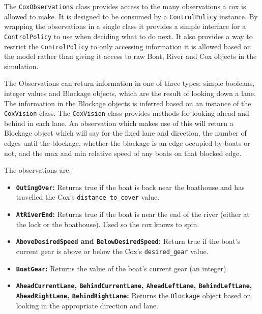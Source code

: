 The \texttt{CoxObservations} class provides access to the many observations a cox is allowed to make. It is designed to be consumed by a \texttt{ControlPolicy} instance. By wrapping the observations in a single class it provides a simple interface for a \texttt{ControlPolicy} to use when deciding what to do next. It also provides a way to restrict the \texttt{ControlPolicy} to only accessing information it is allowed based on the model rather than giving it access to raw Boat, River and Cox objects in the simulation.

The Observations can return information in one of three types: simple booleans, integer values and Blockage objects, which are the result of looking down a lane. The information in the Blockage objects is inferred based on an instance of the \texttt{CoxVision} class. The \texttt{CoxVision} class provides methods for looking ahead and behind in each lane. An observation which makes use of this will return a Blockage object which will say for the fixed lane and direction, the number of edges until the blockage, whether the blockage is an edge occupied by boats or not, and the max and min relative speed of any boats on that blocked edge.

The observations are:
  \begin{itemize}
    \item{\textbf{\texttt{OutingOver}:}} Returns true if the boat is back near the boathouse and has travelled the Cox's \texttt{distance\_to\_cover} value.
    \item{\textbf{\texttt{AtRiverEnd}:}} Returns true if the boat is near the end of the river (either at the lock or the boathouse). Used so the cox knows to spin.
    \item{\textbf{\texttt{AboveDesiredSpeed} and \texttt{BelowDesiredSpeed}:}} Return true if the boat's current gear is above or below the Cox's \texttt{desired\_gear} value. 
    \item{\textbf{\texttt{BoatGear}:}} Returns the value of the boat's current gear (an integer).
    \item{\textbf{\texttt{AheadCurrentLane}, \texttt{BehindCurrentLane}, \texttt{AheadLeftLane}, \texttt{BehindLeftLane}, \texttt{AheadRightLane}, \texttt{BehindRightLane}:}} Returns the \texttt{Blockage} object based on looking in the appropriate direction and lane.
  \end{itemize}
  
